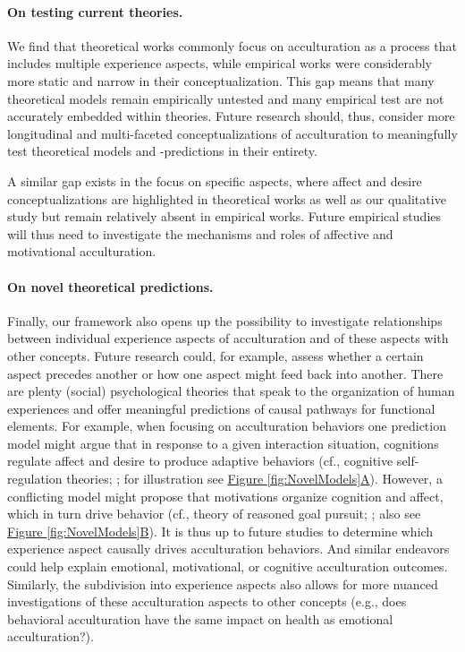 \documentclass[man, 12pt, a4paper, mask]{apa7}
\begin{document}
\paragraph{On testing current theories.} We find that theoretical works commonly focus on acculturation as a process that includes multiple experience aspects, while empirical works were considerably more static and narrow in their conceptualization. This gap means that many theoretical models remain empirically untested and many empirical test are not accurately embedded within theories. Future research should, thus, consider more longitudinal and multi-faceted conceptualizations of acculturation to meaningfully test theoretical models and -predictions in their entirety.

A similar gap exists in the focus on specific aspects, where affect and desire conceptualizations are highlighted in theoretical works as well as our qualitative study but remain relatively absent in empirical works. Future empirical studies will thus need to investigate the mechanisms and roles of affective and motivational acculturation.

\paragraph{On novel theoretical predictions.} Finally, our framework also opens up the possibility to investigate relationships between individual experience aspects of acculturation and of these aspects with other concepts. Future research could, for example, assess whether a certain aspect precedes another or how one aspect might feed back into another. There are plenty (social) psychological theories that speak to the organization of human experiences and offer meaningful predictions of causal pathways for functional elements. For example, when focusing on acculturation behaviors one prediction model might argue that in response to a given interaction situation, cognitions regulate affect and desire to produce adaptive behaviors (cf., cognitive self-regulation theories; \citealp{Panadero2017}; for illustration see \hyperref[fig:NovelModels]{Figure \ref*{fig:NovelModels}A}). However, a conflicting model might propose that motivations organize cognition and affect, which in turn drive behavior (cf., theory of reasoned goal pursuit; \citealp{Ajzen2019}; also see \hyperref[fig:NovelModels]{Figure \ref*{fig:NovelModels}B}). It is thus up to future studies to determine which experience aspect causally drives acculturation behaviors. And similar endeavors could help explain emotional, motivational, or cognitive acculturation outcomes. Similarly, the subdivision into experience aspects also allows for more nuanced investigations of these acculturation aspects to other concepts (e.g., does behavioral acculturation have the same impact on health as emotional acculturation?). 
\end{document}
